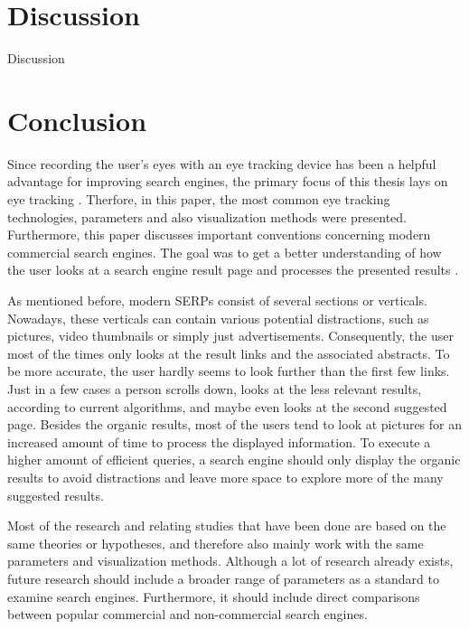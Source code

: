 \section{Discussion}
\label{section:Discussion}
Discussion

\section{Conclusion}
\label{section:Conclusion}
Since recording the user's eyes with an eye tracking device has been a helpful advantage for improving search engines, the primary focus of this thesis lays on eye tracking \autocite{liu2015influence}. Therfore, in this paper, the most common eye tracking technologies, parameters and also visualization methods were presented. Furthermore, this paper discusses important conventions concerning modern commercial search engines. The goal was to get a better understanding of how the user looks at a search engine result page and processes the presented results \autocite{biedert2010eyebook}.

As mentioned before, modern SERPs consist of several sections or verticals. Nowadays, these verticals can contain various potential distractions, such as pictures, video thumbnails or simply just advertisements.   
Consequently, the user most of the times only looks at the result links and the associated abstracts. To be more accurate, the user hardly seems to look further than the first few links. Just in a few cases a person scrolls down, looks at the less relevant results, according to current algorithms, and maybe even looks at the second suggested page.
Besides the organic results, most of the users tend to look at pictures for an increased amount of time to process the displayed information.
To execute a higher amount of efficient queries, a search engine should only display the organic results to avoid distractions and leave more space to explore more of the many suggested results.

Most of the research and relating studies that have been done are based on the same theories or hypotheses, and therefore also mainly work with the same parameters and visualization methods. 
Although a lot of research already exists, future research should include a broader range of parameters as a standard to examine search engines. Furthermore, it should include direct comparisons between popular commercial and non-commercial search engines.



